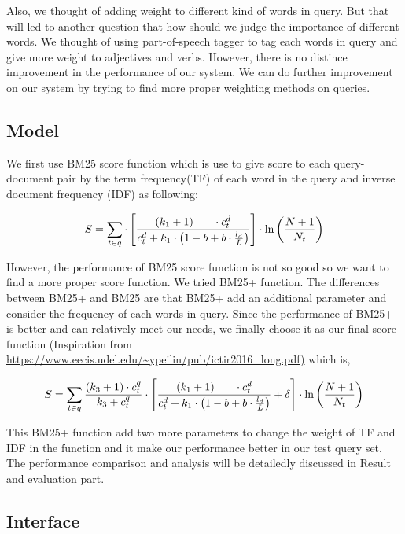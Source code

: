 \documentclass[sigconf,nonacm]{acmart}
\begin{document}
Also, we thought of adding weight to different kind of words in query. But that will led to another question that how should we judge the importance of different words. We thought of using part-of-speech tagger to tag each words in query and give more weight to adjectives and verbs. However, there is no distince improvement in the performance of our system. We can do further improvement on our system by trying to find more proper weighting methods on queries.

\subsection{Model}

We first use BM25 score function which is use to give score to each query-document pair by the term frequency(TF) of each word in the query and inverse document frequency (IDF) as following:

{
\Small
$$
  S = \sum_{t \in q} \cdot\left[\frac{\left(k_{1}+1\right) \\ \cdot c_{t}^{d}}{c_{t}^{d}+k_{1} \cdot\left(1-b+b \cdot \frac{l_{d}}{L}\right)}\right] \cdot \ln \left(\frac{N+1}{N_{t}}\right)
$$
}

However, the performance of BM25 score function is not so good so we want to find a more proper score function. We tried BM25+ function. The differences between BM25+ and BM25 are that BM25+ add an additional parameter and consider the frequency of each words in query. Since the performance of BM25+ is better and can relatively meet our needs, we finally choose it as our final score function (Inspiration from \url{https://www.eecis.udel.edu/~ypeilin/pub/ictir2016_long.pdf)} which is,

{
\Small
$$
  S = \sum_{t \in q} \frac{\left(k_{3}+1\right) \cdot c_{t}^{q}}{k_{3}+c_{t}^{q}} \cdot\left[\frac{\left(k_{1}+1\right) \\ \cdot c_{t}^{d}}{c_{t}^{d}+k_{1} \cdot\left(1-b+b \cdot \frac{l_{d}}{L}\right)}+\delta\right] \cdot \ln \left(\frac{N+1}{N_{t}}\right)
$$
}


This BM25+ function add two more parameters to change the weight of TF and IDF in the function and it make our performance better in our test query set. The performance comparison and analysis will be detailedly discussed in Result and evaluation part.

\subsection{Interface}
\end{document}
